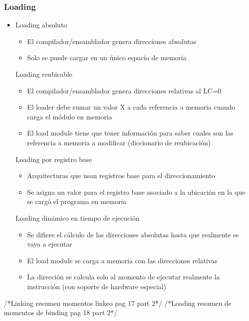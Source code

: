 		\subsubsection{Loading}
			\begin{itemize}
			\item Loading absoluto
				\begin{itemize}
				\item El compilador/ensamblador genera direcciones absolutas
				\item Solo se puede cargar en un único espacio de memoria
				\end{itemize}
			Loading reubicable
				\begin{itemize}
				\item El compilador/ensamblador genera direcciones relativas al LC=0
				\item El loader debe sumar un valor X a cada referencia a memoria cuando carga el módulo en memoria
				\item El load module tiene que tener información para saber cuales son las referencia a memoria a modificar (diccionario de reubicación)
				\end{itemize}
			Loading por registro base
				\begin{itemize}
				\item Arquitecturas que usan registros base para el direccionamiento
				\item Se asigna un valor para el registro base asociado a la ubicación en la que se cargó el programa en memoria
				\end{itemize}
			Loading dinámico en tiempo de ejecución
				\begin{itemize}
				\item Se difiere el cálculo de las direcciones absolutas hasta que realmente se vaya a ejecutar
				\item El load module se carga a memoria con las direcciones relativas
				\item La dirección se calcula solo al momento de ejecutar realmente la instrucción (con soporte de hardware especial)
				\end{itemize}
			\end{itemize}
		/*Linking resumen momentos linkeo pag 17 part 2*/
		/*Loading resumen de momentos de binding pag 18 part 2*/
